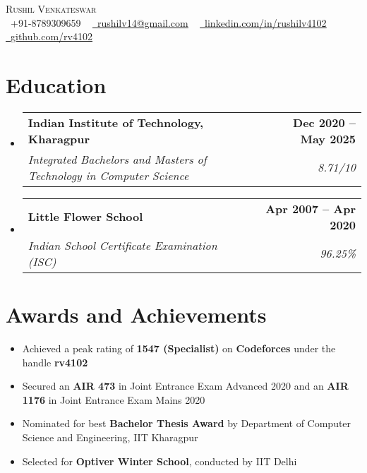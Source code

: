 \documentclass[letterpaper,9pt]{article}
\makeatletter
\newcommand{\resumeItem}[1]{
  \item\small{
    {#1 \vspace{-2pt}}
  }
}
\newcommand{\resumeSubheading}[4]{
  \vspace{-2pt}\item
    \begin{tabular*}{1.0\textwidth}[t]{l@{\extracolsep{\fill}}r}
      \textbf{#1} & \textbf{\small #2} \\
      \textit{\small#3} & \textit{\small #4} \\
    \end{tabular*}\vspace{-7pt}
}
\newcommand{\resumeSubHeadingListStart}{\begin{itemize}[leftmargin=0.0in, label={}]}
\newcommand{\resumeSubHeadingListEnd}{\end{itemize}}
\newcommand{\resumeItemListStart}{\begin{itemize}}
\newcommand{\resumeItemListEnd}{\end{itemize}\vspace{-5pt}}
\makeatother
\begin{document}

\begin{center}
    {\Huge \scshape Rushil Venkateswar} \\ \vspace{1.5pt}
    \small \raisebox{-0.1\height}\faPhone\ +91-8789309659 ~ \href{mailto:x=rushilv14@gmail.com}{\raisebox{-0.2\height}\faEnvelope\  \underline{rushilv14@gmail.com}} ~ 
    \href{https://www.linkedin.com/in/rushilv4102/}{\raisebox{-0.2\height}\faLinkedin\ \underline{linkedin.com/in/rushilv4102}}  ~
    \href{https://github.com/rv4102}{\raisebox{-0.2\height}\faGithub\ \underline{github.com/rv4102}}
    \vspace{-8pt}
\end{center}


\section{Education}
  \resumeSubHeadingListStart
    \resumeSubheading
      {Indian Institute of Technology, Kharagpur}
      {Dec 2020 -- May 2025}
      {Integrated Bachelors and Masters of Technology in Computer Science}{8.71/10}
    
    \resumeSubheading
      {Little Flower School}
      {Apr 2007 -- Apr 2020}
      {Indian School Certificate Examination (ISC)}
      {96.25\%}
  \resumeSubHeadingListEnd
  \vspace{-8pt}

\section{Awards and Achievements}
    \resumeItemListStart
    \itemsep0em 
        \resumeItem{Achieved a peak rating of \textbf{1547 (Specialist)} on \textbf{Codeforces} under the handle \textbf{rv4102}}
        \resumeItem{Secured an \textbf{AIR 473} in Joint Entrance Exam Advanced 2020 and an \textbf{AIR 1176} in Joint Entrance Exam Mains 2020}
        \resumeItem{Nominated for best \textbf{Bachelor Thesis Award} by Department of Computer Science and Engineering, IIT Kharagpur}
        \resumeItem{Selected for \textbf{Optiver Winter School}, conducted by IIT Delhi}
    \resumeItemListEnd
    \vspace{-10pt}
  
\end{document}
